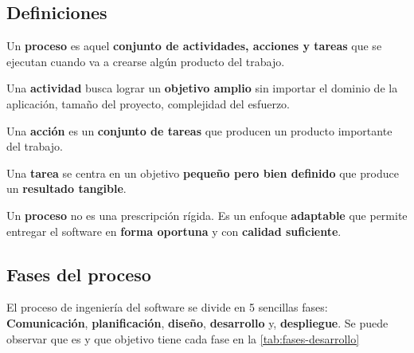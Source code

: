\documentclass[a4paper,11pt]{report}
\begin{document}
    \subsection{Definiciones}
    \begin{definicion}
        Un \textbf{proceso} es aquel \textbf{conjunto de actividades, acciones y tareas} que se ejecutan cuando va a crearse algún producto del trabajo.
    \end{definicion}
    \begin{definicion}
        Una \textbf{actividad} busca lograr un \textbf{objetivo amplio} sin importar el dominio de la aplicación, tamaño del proyecto, complejidad del esfuerzo.
    \end{definicion}

    \begin{definicion}
        Una \textbf{acción} es un \textbf{conjunto de tareas} que producen un producto importante del trabajo.
    \end{definicion}
    \begin{definicion}
        Una \textbf{tarea} se centra en un objetivo \textbf{pequeño pero bien definido} que produce un \textbf{resultado tangible}.
    \end{definicion}
\begin{definicion}
    Un \textbf{proceso} no es una prescripción rígida. Es un enfoque
\textbf{adaptable} que permite entregar el software en\textbf{ forma
oportuna} y con \textbf{calidad suficiente}.
\end{definicion}

\subsection{Fases del proceso}
El proceso de ingeniería del software se divide en 5 sencillas fases: \textbf{Comunicación}, \textbf{planificación}, \textbf{diseño}, \textbf{desarrollo} y, \textbf{despliegue}.
Se puede observar que es y que objetivo tiene cada fase en la \autoref{tab:fases-desarrollo}
\end{document}
